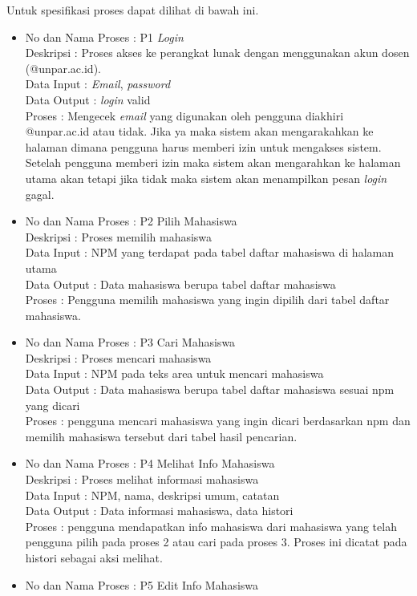 \begin{enumerate}[(1)]
Untuk spesifikasi proses dapat dilihat di bawah ini.
\begin{itemize}
\item No dan Nama Proses : P1 {\it Login}\\
Deskripsi : Proses akses ke perangkat lunak dengan menggunakan akun dosen (@unpar.ac.id).\\
Data Input : {\it Email}, {\it password}\\
Data Output : {\it login} valid\\
Proses : Mengecek {\it email} yang digunakan oleh pengguna diakhiri @unpar.ac.id atau tidak. Jika ya maka sistem akan mengarakahkan ke halaman dimana pengguna harus memberi izin untuk mengakses sistem. Setelah pengguna memberi izin maka sistem akan mengarahkan ke halaman utama akan tetapi jika tidak maka sistem akan menampilkan pesan {\it login} gagal.
\item No dan Nama Proses : P2 Pilih Mahasiswa\\
Deskripsi : Proses memilih mahasiswa\\
Data Input : NPM yang terdapat pada tabel daftar mahasiswa di halaman utama\\
Data Output : Data mahasiswa berupa tabel daftar mahasiswa\\
Proses : Pengguna memilih mahasiswa yang ingin dipilih dari tabel daftar mahasiswa.
\item No dan Nama Proses : P3 Cari Mahasiswa\\
Deskripsi : Proses mencari mahasiswa\\
Data Input : NPM pada teks area untuk mencari mahasiswa\\
Data Output : Data mahasiswa berupa tabel daftar mahasiswa sesuai npm yang dicari\\
Proses : pengguna mencari mahasiswa yang ingin dicari berdasarkan npm dan memilih mahasiswa tersebut dari tabel hasil pencarian.
\item No dan Nama Proses : P4 Melihat Info Mahasiswa\\
Deskripsi : Proses melihat informasi mahasiswa\\
Data Input : NPM, nama, deskripsi umum, catatan\\
Data Output : Data informasi mahasiswa, data histori\\
Proses : pengguna mendapatkan info mahasiswa dari mahasiswa yang telah pengguna pilih pada proses 2 atau cari pada proses 3. Proses ini dicatat pada histori sebagai aksi melihat.
\item No dan Nama Proses : P5 Edit Info Mahasiswa\\

\end{itemize}
\end{enumerate}
